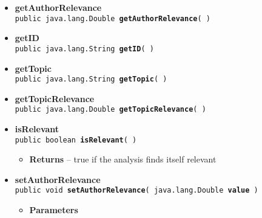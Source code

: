 {{{\begin{itemize}
{\begin{itemize}
{Creates a Analysis object from a YAML string. Used for instance when handling an incoming Analysis message to recreate the Analysis object.
}
\item{
{\bf Parameters}
  \begin{itemize}
   \item{
{\tt in} -- a YAML string representing the contents of an Analysis object}
  \end{itemize}
}%
\item{{\bf Returns} -- 
a newly created Analysis object, initialized with the contents of the YAML string 
}%
\end{itemize}
}%
 \item{ 
{\bf getAuthorRelevance}\\
{\tt public java.lang.Double\ {\bf getAuthorRelevance}(  )
\label{amber.common.Analysis.getAuthorRelevance()}}%
}%
 \item{ 
{\bf getID}\\
{\tt public java.lang.String\ {\bf getID}(  )
\label{amber.common.Analysis.getID()}}%
}%
 \item{ 
{\bf getTopic}\\
{\tt public java.lang.String\ {\bf getTopic}(  )
\label{amber.common.Analysis.getTopic()}}%
}%
 \item{ 
{\bf getTopicRelevance}\\
{\tt public java.lang.Double\ {\bf getTopicRelevance}(  )
\label{amber.common.Analysis.getTopicRelevance()}}%
}%
 \item{ 
{\bf isRelevant}\\
{\tt public boolean\ {\bf isRelevant}(  )
\label{amber.common.Analysis.isRelevant()}}%
\begin{itemize}
\item{{\bf Returns} -- 
true if the analysis finds itself relevant 
}%
\end{itemize}
}%
 \item{ 
{\bf setAuthorRelevance}\\
{\tt public void\ {\bf setAuthorRelevance}( {\tt java.lang.Double} {\bf value} )
\label{amber.common.Analysis.setAuthorRelevance(java.lang.Double)}}%
\begin{itemize}
\item{
{\bf Parameters}
}
\end{itemize}}
\end{itemize}}}}
